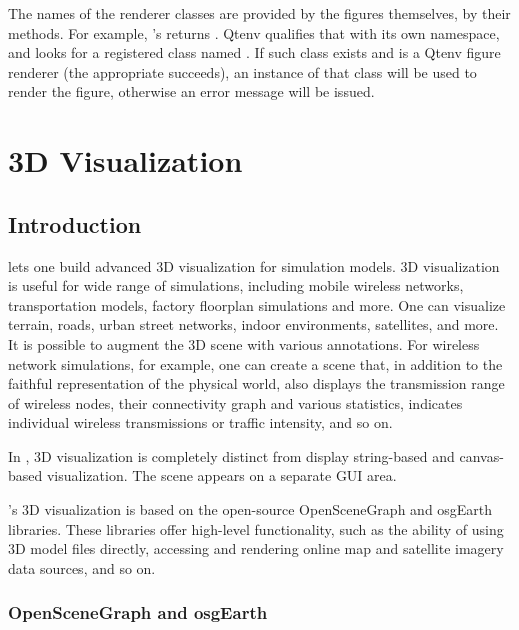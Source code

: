 The names of the renderer classes are provided by the figures themselves,
by their  methods. For example,
's  returns
. Qtenv qualifies that with its own namespace, and
looks for a registered class named
. If such class exists and is a
Qtenv figure renderer (the appropriate  succeeds), an
instance of that class will be used to render the figure, otherwise an
error message will be issued.


\section{3D Visualization}
\label{sec:graphics:osg}

\subsection{Introduction}
\label{sec:graphics:osg-introduction}

{\opp} lets one build advanced 3D visualization for simulation models.
3D visualization is useful for wide range of simulations, including
mobile wireless networks, transportation models, factory floorplan
simulations and more. One can visualize terrain, roads, urban street
networks, indoor environments, satellites, and more. It is possible to
augment the 3D scene with various annotations. For wireless network
simulations, for example, one can create a scene that, in addition to
the faithful representation of the physical world, also displays the
transmission range of wireless nodes, their connectivity graph
and various statistics, indicates individual wireless transmissions
or traffic intensity, and so on.

In {\opp}, 3D visualization is completely distinct from display
string-based and canvas-based visualization. The scene appears on a
separate GUI area.

{\opp}'s 3D visualization is based on the open-source OpenSceneGraph
and osgEarth libraries. These libraries offer high-level functionality,
such as the ability of using 3D model files directly, accessing and
rendering online map and satellite imagery data sources, and so on.

\subsubsection{OpenSceneGraph and osgEarth}
\label{sec:graphics:osg-and-osgearth}

